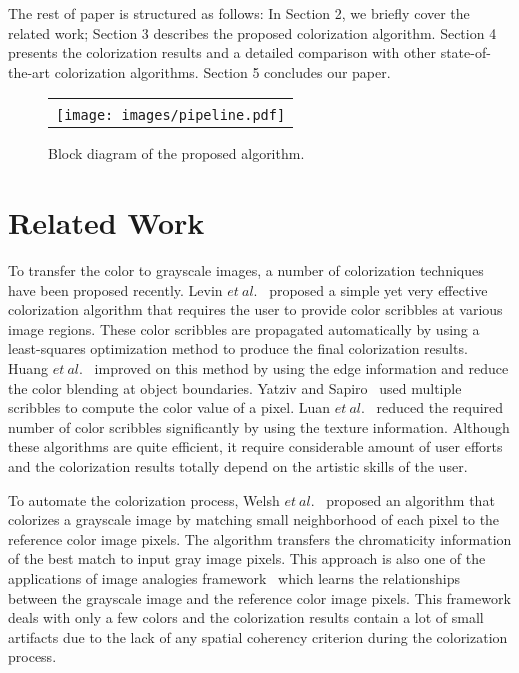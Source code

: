 \documentclass[twocolumn]{svjour3}          %
\begin{document}
The rest of paper is structured as follows: In Section 2, we briefly cover the related work; Section 3 describes the proposed colorization algorithm. Section 4 presents the colorization results and a detailed comparison with other state-of-the-art colorization algorithms. Section 5 concludes our paper.


\begin{figure*}\center
\begin{minipage}[t]{\linewidth}
\centering
\begin{tabular}{c@{\hspace{0mm}}}
\\\vspace{0mm}\\
\texttt{[image: images/pipeline.pdf]}
\end{tabular}
\end{minipage}
 \caption{Block diagram of the proposed algorithm.}
\label{fig:pipeline}
\end{figure*}

\section{Related Work}
\label{sec:2}
To transfer the color to grayscale images, a number of colorization techniques have been proposed recently. Levin $et\ al.$~\cite{Levin04} proposed a simple yet very effective colorization algorithm that requires the user to provide color scribbles at various image regions. These color scribbles are propagated automatically by using a least-squares optimization method to produce the final colorization results. Huang $et\ al.$~\cite{Huang05} improved on this method by using the edge information and reduce the color blending at object boundaries. Yatziv and Sapiro~\cite{Yatziv06} used multiple scribbles to compute the color value of a pixel. Luan $et\ al.$~\cite{Luan07} reduced the required number of color scribbles significantly by using the texture information. Although these algorithms are quite efficient, it require considerable amount of user efforts and the colorization results totally depend on the artistic skills of the user.

To automate the colorization process, Welsh $et\ al.$~\cite{Welsh02} proposed an algorithm that colorizes a grayscale image by matching small neighborhood of each pixel to the reference color image pixels. The algorithm transfers the chromaticity information of the best match to input gray image pixels. This approach is also one of the applications of image analogies framework~\cite{Aaron01} which learns the relationships between the grayscale image and the reference color image pixels. This framework deals with only a few colors and the colorization results contain a lot of small artifacts due to the lack of any spatial coherency criterion during the colorization process.
\end{document}
